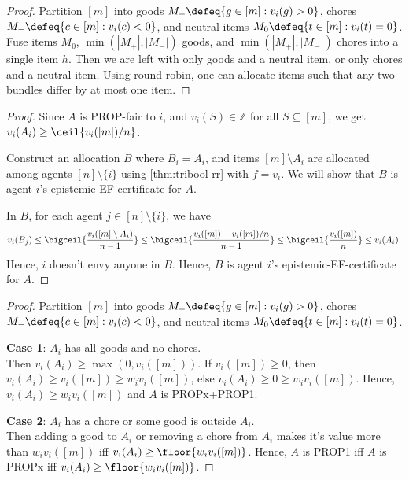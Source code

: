 \begin{proof}
Partition $[m]$ into
goods $M_+ \defeq \{g \in [m]: v_i(g) > 0\}$,
chores $M_- \defeq \{c \in [m]: v_i(c) < 0\}$,
and neutral items $M_0 \defeq \{t \in [m]: v_i(t) = 0\}$.
Fuse items $M_0$, $\min(|M_+|, |M_-|)$ goods, and $\min(|M_+|, |M_-|)$ chores
into a single item $h$.
Then we are left with only goods and a neutral item,
or only chores and a neutral item.
Using round-robin, one can allocate items such that
any two bundles differ by at most one item.
\end{proof}

\begin{proof}
Since $A$ is PROP-fair to $i$, and $v_i(S) \in \mathbb{Z}$ for all $S \subseteq [m]$,
we get $v_i(A_i) \ge \ceil{v_i([m])/n}$.

Construct an allocation $B$ where $B_i = A_i$, and items $[m] \setminus A_i$
are allocated among agents $[n] \setminus \{i\}$ using \cref{thm:tribool-rr} with $f = v_i$.
We will show that $B$ is agent $i$'s epistemic-EF-certificate for $A$.

In $B$, for each agent $j \in [n] \setminus \{i\}$, we have
\[ v_i(B_j) \le \bigceil{\frac{v_i([m] \setminus A_i)}{n-1}}
    \le \bigceil{\frac{v_i([m]) - v_i([m])/n}{n-1}}
    \le \bigceil{\frac{v_i([m])}{n}} \le v_i(A_i). \]
Hence, $i$ doesn't envy anyone in $B$.
Hence, $B$ is agent $i$'s epistemic-EF-certificate for $A$.
\end{proof}

\begin{proof}
Partition $[m]$ into
goods $M_+ \defeq \{g \in [m]: v_i(g) > 0\}$,
chores $M_- \defeq \{c \in [m]: v_i(c) < 0\}$,
and neutral items $M_0 \defeq \{t \in [m]: v_i(t) = 0\}$.

\textbf{Case 1}: $A_i$ has all goods and no chores.
\\ Then $v_i(A_i) \ge \max(0, v_i([m]))$.
If $v_i([m]) \ge 0$, then $v_i(A_i) \ge v_i([m]) \ge w_iv_i([m])$,
else $v_i(A_i) \ge 0 \ge w_iv_i([m])$.
Hence, $v_i(A_i) \ge w_iv_i([m])$ and $A$ is PROPx+PROP1.

\textbf{Case 2}: $A_i$ has a chore or some good is outside $A_i$.
\\ Then adding a good to $A_i$ or removing a chore from $A_i$
makes it's value more than $w_iv_i([m])$ iff $v_i(A_i) \ge \floor{w_iv_i([m])}$.
Hence, $A$ is PROP1 iff $A$ is PROPx iff $v_i(A_i) \ge \floor{w_iv_i([m])}$.
\end{proof}

